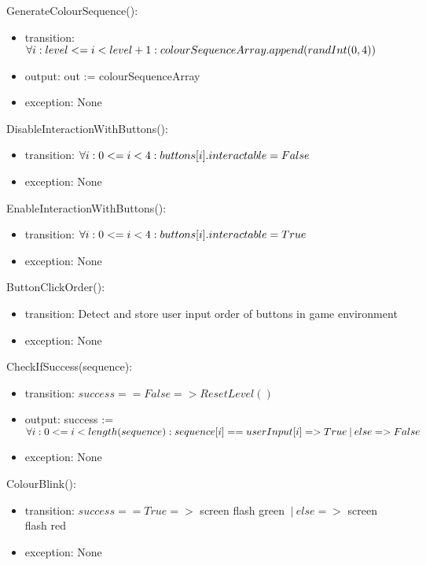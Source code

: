 \documentclass[12pt, titlepage]{article}
\begin{document}
\noindent GenerateColourSequence():
\begin{itemize}
\item transition: $ \forall i: level <= i < level + 1 : \newline colourSequenceArray.append(randInt(0,4))$
\item output: out := colourSequenceArray
\item exception: None
\end{itemize}

\noindent DisableInteractionWithButtons():
\begin{itemize}
\item transition: $ \forall i: 0 <= i < 4 : \newline buttons[i].interactable = False$
\item exception: None
\end{itemize}

\noindent EnableInteractionWithButtons():
\begin{itemize}
\item transition: $ \forall i: 0 <= i < 4 : \newline buttons[i].interactable = True$
\item exception: None
\end{itemize}

\noindent ButtonClickOrder():
\begin{itemize}
\item transition: Detect and store user input order of buttons in game environment
\item exception: None
\end{itemize}

\noindent CheckIfSuccess(sequence):
\begin{itemize}
\item transition: $success == False => ResetLevel()$
\item output: success := $ \forall i: 0 <= i < length(sequence) : \newline sequence[i] == userInput[i] => True  \: | \: else => False$
\item exception: None
\end{itemize}

\noindent ColourBlink():
\begin{itemize}
\item transition: $success == True =>$ screen flash green $\: | \: else =>$ screen flash red
\item exception: None
\end{itemize}
\end{document}
